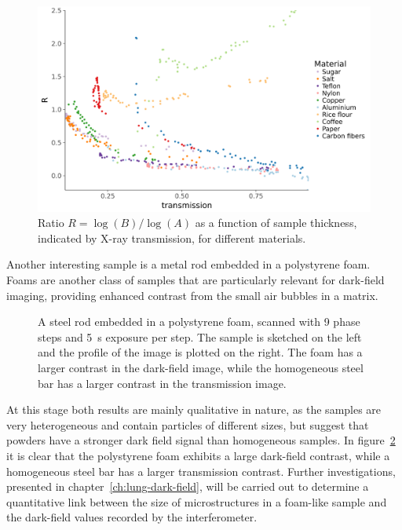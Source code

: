 \begin{figure}[ht]
    \centering
    \includegraphics[width=\textwidth]{gfx/powders-aggregated.png}
    \caption{Ratio $R = \log(B) / \log(A)$ as a function of sample
    thickness, indicated by X-ray transmission, for different materials.}
    \label{fig:powders}
\end{figure}

Another interesting sample is a metal rod embedded in a polystyrene foam.
Foams are another class of samples that are particularly relevant for
dark-field imaging, providing enhanced contrast from the small air bubbles
in a matrix.

\begin{figure}[h!]
    \centering
    \begin{subfigure}[b]{.49\textwidth}
        \resizebox{\textwidth}{!}{}
        \caption{}
    \end{subfigure}
    \begin{subfigure}[b]{.49\textwidth}
        \resizebox{\textwidth}{!}{}
        \caption{}
    \end{subfigure}
    \caption{A steel rod embedded in a polystyrene foam, scanned with \num{9} phase
steps and \SI{5}{\second} exposure per step. The sample is sketched on the
left and the profile of the image is plotted on the right. The foam has a larger contrast
in the dark-field image, while the homogeneous steel bar has a larger
contrast in the transmission image.}
\label{fig:steelrod}
\end{figure}

At this stage both results are mainly qualitative in nature, as the samples
are very heterogeneous and contain particles of different sizes, but suggest
that powders have a stronger dark field signal than homogeneous samples. In
figure~\ref{fig:steelrod} it is clear that the polystyrene foam exhibits a
large dark-field contrast, while a homogeneous steel bar has a larger
transmission contrast.
Further investigations, presented in
chapter~\ref{ch:lung-dark-field}, will be carried out to determine a
quantitative link between the size of microstructures in a foam-like sample 
and the dark-field values recorded by the interferometer.

